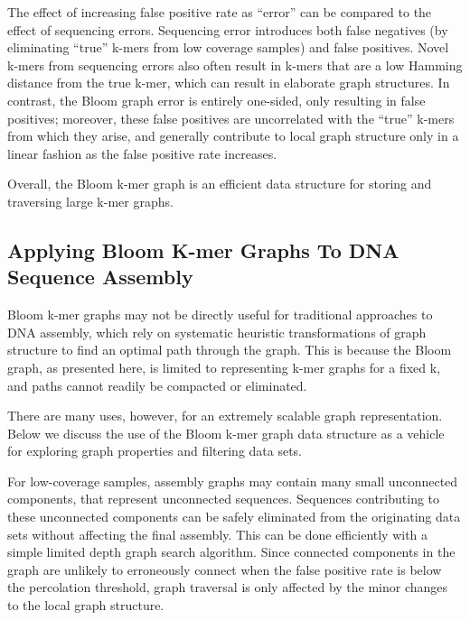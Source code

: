 \documentclass[12pt]{article} \usepackage{simplemargins}
\begin{document}
The effect of increasing false positive rate as ``error'' can be
compared to the effect of sequencing errors.  Sequencing error
introduces both false negatives (by eliminating ``true'' k-mers from
low coverage samples) and false positives.  Novel k-mers
from sequencing errors also often result in k-mers that are
a low Hamming distance from the true k-mer, which can result in
elaborate graph structures.  In contrast, the Bloom graph error is
entirely one-sided, only resulting in false positives; moreover, these
false positives are uncorrelated with the ``true'' k-mers from which
they arise, and generally contribute to local graph structure only 
in a linear fashion as the false positive rate increases.

Overall, the Bloom k-mer graph is an efficient data structure for
storing and traversing large k-mer graphs.

\subsection{Applying Bloom K-mer Graphs To DNA Sequence Assembly}
Bloom k-mer graphs may not be directly useful for traditional
approaches to DNA assembly, which rely on systematic heuristic
transformations of graph structure to find an optimal path through the
graph.  This is because the Bloom graph, as presented here, is limited
to representing k-mer graphs for a fixed k, and paths cannot readily
be compacted or eliminated.

There are many uses, however, for an extremely scalable
graph representation.  Below we discuss the use of the
Bloom k-mer graph data structure as a vehicle for exploring graph
properties and filtering data sets.

For low-coverage samples, assembly graphs may contain many small
unconnected components, that represent unconnected sequences.
Sequences contributing to these unconnected components can be safely
eliminated from the originating data sets without affecting the final
assembly.  This can be done efficiently with a simple limited depth
graph search algorithm. Since connected components in the graph 
are unlikely to erroneously connect when the false positive rate 
is below the percolation threshold, graph traversal is only affected 
by the minor changes to the local graph structure.
\end{document}

